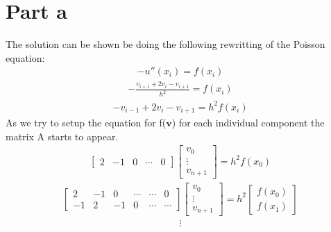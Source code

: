 \documentclass[american,a4paper,12pt]{article}
\renewcommand{\vec}[1]{\mathbf{#1}} %
\begin{document}
\section{Part a}
The solution can be shown be doing the following rewritting of the Poisson equation:
\begin{align*}
  -u''(x_i) = f(x_i)
\end{align*}
\begin{align*}
  -\frac{v_{i+1} + 2v_i - v_{i+1}}{h^2} = f(x_i)
\end{align*}
\begin{align*}
  -v_{i-1} + 2v_i - v_{i+1} = h^2f(x_i)
\end{align*}
As we try to setup the equation for f($\vec{v}$) for each individual component the matrix A starts to appear.
\begin{align*}
      \begin{bmatrix}
        2 & -1 & 0 & \cdots & 0
      \end{bmatrix}
      \begin{bmatrix}
        v_0 \\
        \vdots \\
        v_{n+1}
      \end{bmatrix}
= h^2f(x_0)
\end{align*}
\begin{align*}
      \begin{bmatrix}
        2 & -1 & 0 & \cdots & \cdots & 0 \\
        -1 & 2 & -1 & 0 & \cdots & \cdots
      \end{bmatrix}
      \begin{bmatrix}
        v_0 \\
        \vdots \\
        v_{n+1}
      \end{bmatrix}
= h^2
      \begin{bmatrix}
        f(x_0) \\
        f(x_1)
      \end{bmatrix}
\end{align*}
\begin{align*}
  \vdots
\end{align*}
\end{document}
